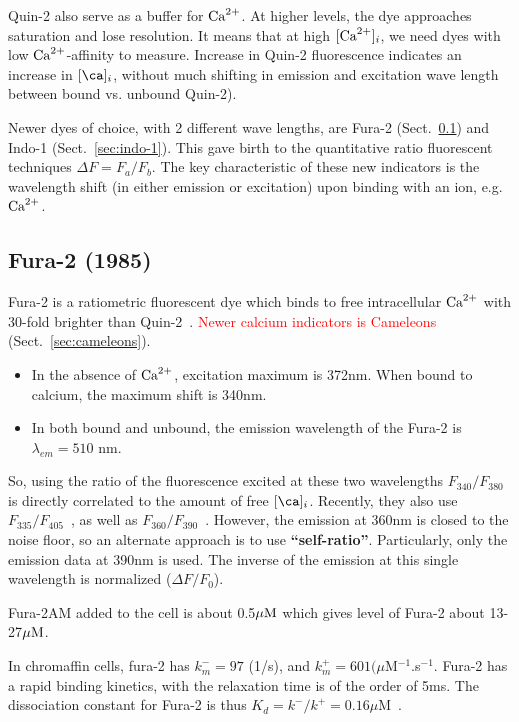 Quin-2 also serve as a buffer for ${\text{Ca}^{2+}}$. At higher levels, the dye approaches
saturation and lose resolution.
It means that at high $[{\text{Ca}^{2+}}]_i$, we need dyes with low ${\text{Ca}^{2+}}$-affinity to
measure. Increase in Quin-2 fluorescence indicates an increase
in $[\ca]_i$, without much shifting in emission and excitation wave
length between bound vs. unbound Quin-2).

Newer dyes of choice, with 2 different wave lengths, are Fura-2
(Sect.~\ref{sec:fura-2}) and Indo-1 (Sect.~\ref{sec:indo-1}).  This gave birth
to the quantitative ratio fluorescent techniques $\Delta F=F_a/F_b$. The key
characteristic of these new indicators is the wavelength shift (in either
emission or excitation) upon binding with an ion, e.g. ${\text{Ca}^{2+}}$.


\subsection{Fura-2 (1985)}
\label{sec:fura-2}

Fura-2 is a ratiometric fluorescent dye which binds to free intracellular ${\text{Ca}^{2+}}$
with 30-fold brighter than Quin-2~\citep{grynkiewicz1985}.
\textcolor{red}{ Newer calcium indicators is Cameleons}
(Sect.~\ref{sec:cameleons}).
\begin{itemize}
\item In the absence of ${\text{Ca}^{2+}}$, excitation maximum is 372nm. When bound
  to calcium, the maximum shift is 340nm.

\item In both bound and unbound, the emission wavelength of the Fura-2
  is $\lambda_{em}=510$ nm.
\end{itemize}

So, using the ratio of the fluorescence excited at these two
wavelengths $F_{340}/F_{380}$ is directly correlated to the amount of
free $[\ca]_i$. Recently, they also use
$F_{335}/F_{405}$~\citep{goldhaber1991,chudin1999icd}, as well as
$F_{360}/F_{390}$~\citep{Larbig2010}. However, the emission at 360nm
is closed to the noise floor, so an alternate approach is to use
{\bf ``self-ratio''}. Particularly, only the emission data at 390nm is
used. The inverse of the emission at this single wavelength is
normalized ($\Delta F/F_0$).

Fura-2AM added to the cell is about 0.5${\mu\text{M}}$ \citep{williams1990qic} which
gives level of Fura-2 about 13-27${\mu\text{M}}$.

In chromaffin cells, fura-2 has $k^-_m=97$ (1/s), and $k^+_m=601
(\mu$M$^{-1}$.s$^{-1}$. Fura-2 has a rapid binding kinetics, with the relaxation
time is of the order of 5ms. The dissociation constant for Fura-2 is thus
$K_d=k^-/k^+=0.16\mu$M~\citep{wagner1994erb}.


